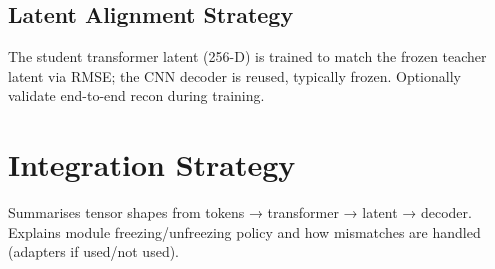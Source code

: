 
\subsection{Latent Alignment Strategy}

The student transformer latent (256-D) is trained to match the frozen teacher latent via RMSE; the CNN decoder is reused, typically frozen. Optionally validate end-to-end recon during training.


\section{Integration Strategy}

Summarises tensor shapes from tokens → transformer → latent → decoder. Explains module freezing/unfreezing policy and how mismatches are handled (adapters if used/not used).


